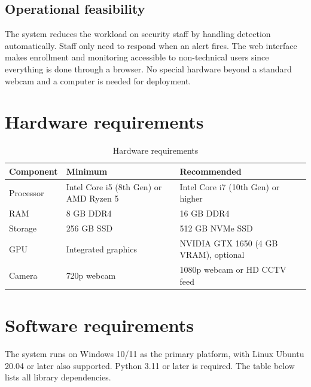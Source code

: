 \documentclass[12pt,a4paper]{report}
\begin{document}
\subsection{Operational feasibility}

The system reduces the workload on security staff by handling detection automatically. Staff only need to respond when an alert fires. The web interface makes enrollment and monitoring accessible to non-technical users since everything is done through a browser. No special hardware beyond a standard webcam and a computer is needed for deployment.

\section{Hardware requirements}

\begin{table}[htbp]
\centering
\begin{tabular}{|p{3.5cm}|p{4.5cm}|p{4.5cm}|}
\hline
\textbf{Component} & \textbf{Minimum} & \textbf{Recommended} \\
\hline
Processor & Intel Core i5 (8th Gen) or AMD Ryzen 5 & Intel Core i7 (10th Gen) or higher \\
\hline
RAM & 8 GB DDR4 & 16 GB DDR4 \\
\hline
Storage & 256 GB SSD & 512 GB NVMe SSD \\
\hline
GPU & Integrated graphics & NVIDIA GTX 1650 (4 GB VRAM), optional \\
\hline
Camera & 720p webcam & 1080p webcam or HD CCTV feed \\
\hline
\end{tabular}
\caption{Hardware requirements}
\label{tab:hardware}
\end{table}

\section{Software requirements}

The system runs on Windows 10/11 as the primary platform, with Linux Ubuntu 20.04 or later also supported. Python 3.11 or later is required. The table below lists all library dependencies.
\end{document}
